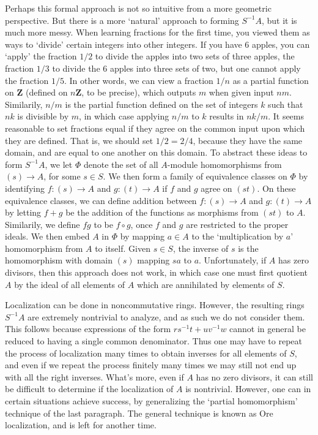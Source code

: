 Perhaps this formal approach is not so intuitive from a more geometric perspective. But there is a more `natural' approach to forming $S^{-1}A$, but it is much more messy. When learning fractions for the first time, you viewed them as ways to `divide' certain integers into other integers. If you have 6 apples, you can `apply' the fraction $1/2$ to divide the apples into two sets of three apples, the fraction $1/3$ to divide the 6 apples into three sets of two, but one cannot apply the fraction $1/5$. In other words, we can view a fraction $1/n$ as a partial function on $\mathbf{Z}$ (defined on $n \mathbf{Z}$, to be precise), which outputs $m$ when given input $nm$. Similarily, $n/m$ is the partial function defined on the set of integers $k$ such that $nk$ is divisible by $m$, in which case applying $n/m$ to $k$ results in $nk/m$. It seems reasonable to set fractions equal if they agree on the common input upon which they are defined. That is, we should set $1/2 = 2/4$, because they have the same domain, and are equal to one another on this domain. To abstract these ideas to form $S^{-1}A$, we let $\Phi$ denote the set of all $A$-module homomorphisms from $(s) \to A$, for some $s \in S$. We then form a family of equivalence classes on $\Phi$ by identifying $f: (s) \to A$ and $g: (t) \to A$ if $f$ and $g$ agree on $(st)$. On these equivalence classes, we can define addition between $f: (s) \to A$ and $g: (t) \to A$ by letting $f + g$ be the addition of the functions as morphisms from $(st)$ to $A$. Similarily, we define $fg$ to be $f \circ g$, once $f$ and $g$ are restricted to the proper ideals. We then embed $A$ in $\Phi$ by mapping $a \in A$ to the `multiplication by $a$' homomorphism from $A$ to itself. Given $s \in S$, the inverse of $s$ is the homomorphism with domain $(s)$ mapping $sa$ to $a$. Unfortunately, if $A$ has zero divisors, then this approach does not work, in which case one must first quotient $A$ by the ideal of all elements of $A$ which are annihilated by elements of $S$.

\begin{remark}
Localization can be done in noncommutative rings. However, the resulting rings $S^{-1}A$ are extremely nontrivial to analyze, and as such we do not consider them. This follows because expressions of the form $rs^{-1}t + uv^{-1}w$ cannot in general be reduced to having a single common denominator. Thus one may have to repeat the process of localization many times to obtain inverses for all elements of $S$, and even if we repeat the process finitely many times we may still not end up with all the right inverses. What's more, even if $A$ has no zero divisors, it can still be difficult to determine if the localization of $A$ is nontrivial. However, one can in certain situations achieve success, by generalizing the `partial homomorphism' technique of the last paragraph. The general technique is known as Ore localization, and is left for another time.
\end{remark}


